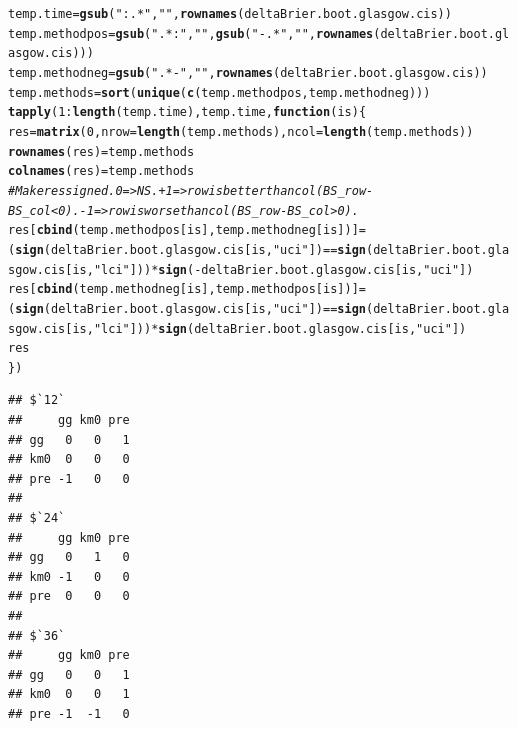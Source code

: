 \documentclass{article}\usepackage[]{graphicx}\usepackage[]{color}
\makeatletter
\newcommand{\hlnum}[1]{\textcolor[rgb]{0.686,0.059,0.569}{#1}}%
\newcommand{\hlstr}[1]{\textcolor[rgb]{0.192,0.494,0.8}{#1}}%
\newcommand{\hlcom}[1]{\textcolor[rgb]{0.678,0.584,0.686}{\textit{#1}}}%
\newcommand{\hlopt}[1]{\textcolor[rgb]{0,0,0}{#1}}%
\newcommand{\hlstd}[1]{\textcolor[rgb]{0.345,0.345,0.345}{#1}}%
\newcommand{\hlkwa}[1]{\textcolor[rgb]{0.161,0.373,0.58}{\textbf{#1}}}%
\newcommand{\hlkwb}[1]{\textcolor[rgb]{0.69,0.353,0.396}{#1}}%
\newcommand{\hlkwc}[1]{\textcolor[rgb]{0.333,0.667,0.333}{#1}}%
\newcommand{\hlkwd}[1]{\textcolor[rgb]{0.737,0.353,0.396}{\textbf{#1}}}%
\newenvironment{kframe}{%
 \def\at@end@of@kframe{}%
 \ifinner\ifhmode%
  \def\at@end@of@kframe{\end{minipage}}%
  \begin{minipage}{\columnwidth}%
 \fi\fi%
 \def\FrameCommand##1{\hskip\@totalleftmargin \hskip-\fboxsep
 \colorbox{shadecolor}{##1}\hskip-\fboxsep
     \hskip-\linewidth \hskip-\@totalleftmargin \hskip\columnwidth}%
 \MakeFramed {\advance\hsize-\width
   \@totalleftmargin\z@ \linewidth\hsize
   \@setminipage}}%
 {\par\unskip\endMakeFramed%
 \at@end@of@kframe}
\newenvironment{knitrout}{}{} %
\makeatother
\begin{document}
\begin{knitrout}
\color{fgcolor}\begin{kframe}
\begin{alltt}
\hlstd{temp.time} \hlkwb{=} \hlkwd{gsub}\hlstd{(}\hlstr{":.*"}\hlstd{,} \hlstr{""}\hlstd{,} \hlkwd{rownames}\hlstd{(deltaBrier.boot.glasgow.cis))}
\hlstd{temp.methodpos} \hlkwb{=} \hlkwd{gsub}\hlstd{(}\hlstr{".*:"}\hlstd{,} \hlstr{""}\hlstd{,} \hlkwd{gsub}\hlstd{(}\hlstr{"-.*"}\hlstd{,} \hlstr{""}\hlstd{,} \hlkwd{rownames}\hlstd{(deltaBrier.boot.glasgow.cis)))}
\hlstd{temp.methodneg} \hlkwb{=} \hlkwd{gsub}\hlstd{(}\hlstr{".*-"}\hlstd{,} \hlstr{""}\hlstd{,} \hlkwd{rownames}\hlstd{(deltaBrier.boot.glasgow.cis))}
\hlstd{temp.methods} \hlkwb{=} \hlkwd{sort}\hlstd{(}\hlkwd{unique}\hlstd{(}\hlkwd{c}\hlstd{(temp.methodpos, temp.methodneg)))}
\hlkwd{tapply}\hlstd{(}\hlnum{1}\hlopt{:}\hlkwd{length}\hlstd{(temp.time), temp.time,} \hlkwa{function}\hlstd{(}\hlkwc{is}\hlstd{) \{}
        \hlstd{res} \hlkwb{=} \hlkwd{matrix}\hlstd{(}\hlnum{0}\hlstd{,} \hlkwc{nrow} \hlstd{=} \hlkwd{length}\hlstd{(temp.methods),} \hlkwc{ncol} \hlstd{=} \hlkwd{length}\hlstd{(temp.methods))}
        \hlkwd{rownames}\hlstd{(res)} \hlkwb{=} \hlstd{temp.methods}
        \hlkwd{colnames}\hlstd{(res)} \hlkwb{=} \hlstd{temp.methods}
        \hlcom{# Make res signed.  0 => NS.  +1 => row is better than col (BS_row - BS_col < 0).  -1 => row is worse than col (BS_row - BS_col > 0).}
        \hlstd{res[}\hlkwd{cbind}\hlstd{(temp.methodpos[is], temp.methodneg[is])]} \hlkwb{=} \hlstd{(}\hlkwd{sign}\hlstd{(deltaBrier.boot.glasgow.cis[is,} \hlstr{"uci"}\hlstd{])} \hlopt{==} \hlkwd{sign}\hlstd{(deltaBrier.boot.glasgow.cis[is,} \hlstr{"lci"}\hlstd{]))} \hlopt{*} \hlkwd{sign}\hlstd{(}\hlopt{-}\hlstd{deltaBrier.boot.glasgow.cis[is,} \hlstr{"uci"}\hlstd{])}
        \hlstd{res[}\hlkwd{cbind}\hlstd{(temp.methodneg[is], temp.methodpos[is])]} \hlkwb{=} \hlstd{(}\hlkwd{sign}\hlstd{(deltaBrier.boot.glasgow.cis[is,} \hlstr{"uci"}\hlstd{])} \hlopt{==} \hlkwd{sign}\hlstd{(deltaBrier.boot.glasgow.cis[is,} \hlstr{"lci"}\hlstd{]))} \hlopt{*} \hlkwd{sign}\hlstd{(deltaBrier.boot.glasgow.cis[is,} \hlstr{"uci"}\hlstd{])}
        \hlstd{res}
\hlstd{\})}
\end{alltt}
\begin{verbatim}
## $`12`
##     gg km0 pre
## gg   0   0   1
## km0  0   0   0
## pre -1   0   0
## 
## $`24`
##     gg km0 pre
## gg   0   1   0
## km0 -1   0   0
## pre  0   0   0
## 
## $`36`
##     gg km0 pre
## gg   0   0   1
## km0  0   0   1
## pre -1  -1   0
\end{verbatim}
\end{kframe}
\end{knitrout}
\end{document}
